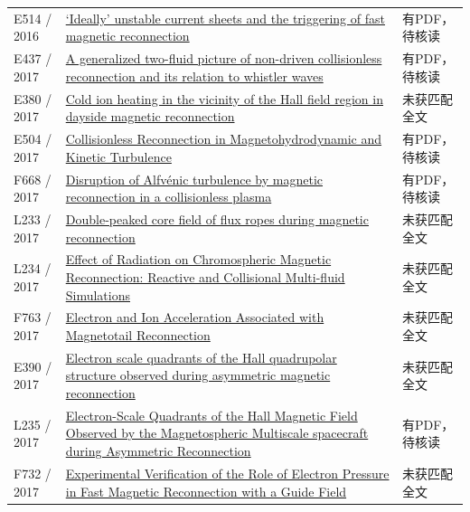 \begin{longtable}{P{24mm}P{97mm}P{27mm}}
E514 / 2016 & \href{https://doi.org/10.1017/s002237781600088x}{‘Ideally’ unstable current sheets and the triggering of fast magnetic reconnection} & 有PDF，待核读\\

E437 / 2017 & \href{https://doi.org/10.1063/1.4982812}{A generalized two-fluid picture of non-driven collisionless reconnection and its relation to whistler waves} & 有PDF，待核读\\

E380 / 2017 & \href{https://confit.atlas.jp/guide/event/jpguagu2017/subject/PEM13-03/detail}{Cold ion heating in the vicinity of the Hall field region in dayside magnetic reconnection} & 未获匹配全文\\

E504 / 2017 & \href{https://doi.org/10.3847/1538-4357/aa9754}{Collisionless Reconnection in Magnetohydrodynamic and Kinetic Turbulence} & 有PDF，待核读\\

F668 / 2017 & \href{https://doi.org/10.1017/s0022377817000812}{Disruption of Alfvénic turbulence by magnetic reconnection in a collisionless plasma} & 有PDF，待核读\\

L233 / 2017 & \href{https://doi.org/10.1002/2017ja024233}{Double‐peaked core field of flux ropes during magnetic reconnection} & 未获匹配全文\\

L234 / 2017 & \href{https://doi.org/10.3847/1538-4357/aa7554}{Effect of Radiation on Chromospheric Magnetic Reconnection: Reactive and Collisional Multi-fluid Simulations} & 未获匹配全文\\

F763 / 2017 & \href{https://escholarship.org/uc/item/0kf95194}{Electron and Ion Acceleration Associated with Magnetotail Reconnection} & 未获匹配全文\\

E390 / 2017 & \href{https://ui.adsabs.harvard.edu/abs/2019EGUGA..21.6241W/abstract}{Electron scale quadrants of the Hall quadrupolar structure observed during asymmetric magnetic reconnection} & 未获匹配全文\\

L235 / 2017 & \href{https://doi.org/10.1103/physrevlett.118.175101}{Electron-Scale Quadrants of the Hall Magnetic Field Observed by the Magnetospheric Multiscale spacecraft during Asymmetric Reconnection} & 有PDF，待核读\\

F732 / 2017 & \href{https://doi.org/10.1103/physrevlett.118.125002}{Experimental Verification of the Role of Electron Pressure in Fast Magnetic Reconnection with a Guide Field} & 未获匹配全文\\


\end{longtable}
